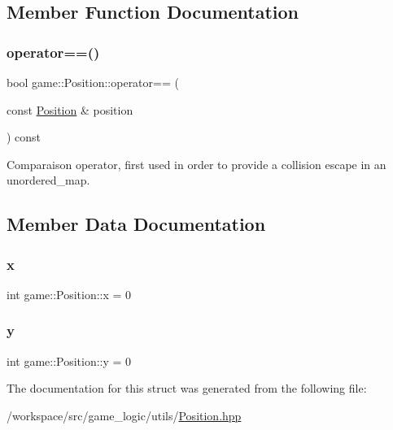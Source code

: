 \subsection{Member Function Documentation}
\mbox{\label{structgame_1_1_position_a4492fdd9c13aa370f4243d69a67708b6}} 
\subsubsection{\texorpdfstring{operator==()}{operator==()}}
{\footnotesize\ttfamily bool game\+::\+Position\+::operator== (\begin{DoxyParamCaption}\item[{const \hyperlink{structgame_1_1_position}{Position} \&}]{position }\end{DoxyParamCaption}) const\hspace{0.3cm}{\ttfamily [inline]}}



Comparaison operator, first used in order to provide a collision escape in an unordered\+\_\+map. 



\subsection{Member Data Documentation}
\mbox{\label{structgame_1_1_position_ae8c20598751c6dcba6f572b6524ed100}} 
\subsubsection{\texorpdfstring{x}{x}}
{\footnotesize\ttfamily int game\+::\+Position\+::x = 0}

\mbox{\label{structgame_1_1_position_a0a6c4037ab49bd23ef3b3426338b39af}} 
\subsubsection{\texorpdfstring{y}{y}}
{\footnotesize\ttfamily int game\+::\+Position\+::y = 0}



The documentation for this struct was generated from the following file\+:\begin{DoxyCompactItemize}
\item 
/workspace/src/game\+\_\+logic/utils/\hyperlink{_position_8hpp}{Position.\+hpp}\end{DoxyCompactItemize}
